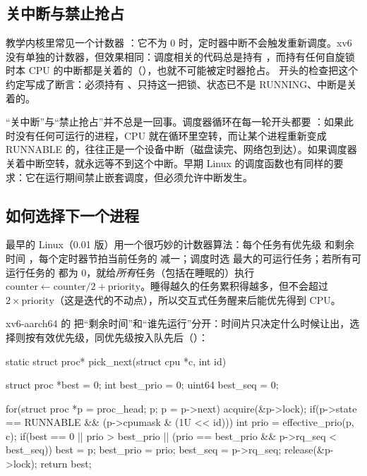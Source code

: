 \subsection{关中断与禁止抢占}

教学内核里常见一个计数器 ：它不为 0 时，定时器中断不会触发重新调度。xv6 没有单独的计数器，但效果相同：调度相关的代码总是持有 ，而持有任何自旋锁时本 CPU 的中断都是关着的（），也就不可能被定时器抢占。 开头的检查把这个约定写成了断言：必须持有 、只持这一把锁、状态已不是 RUNNING、中断是关着的。

“关中断”与“禁止抢占”并不总是一回事。调度器循环在每一轮开头都要 ：如果此时没有任何可运行的进程，CPU 就在循环里空转，而让某个进程重新变成 RUNNABLE 的，往往正是一个设备中断（磁盘读完、网络包到达）。如果调度器关着中断空转，就永远等不到这个中断。早期 Linux 的调度函数也有同样的要求：它在运行期间禁止嵌套调度，但必须允许中断发生。

\subsection{如何选择下一个进程}

最早的 Linux（0.01 版）用一个很巧妙的计数器算法：每个任务有优先级  和剩余时间 ，每个定时器节拍当前任务的  减一；调度时选  最大的可运行任务；若所有可运行任务的  都为 0，就给\emph{所有}任务（包括在睡眠的）执行 $\text{counter} \leftarrow \text{counter}/2 + \text{priority}$。睡得越久的任务累积得越多，但不会超过 $2\times\text{priority}$（这是迭代的不动点），所以交互式任务醒来后能优先得到 CPU。

xv6-aarch64 的  把“剩余时间”和“谁先运行”分开：时间片只决定什么时候让出，选择则按有效优先级，同优先级按入队先后（）：

\begin{ccode}
static struct proc* pick_next(struct cpu *c, int id)
{
  struct proc *best = 0;
  int best_prio = 0;
  uint64 best_seq = 0;

  for(struct proc *p = proc_head; p; p = p->next){
    acquire(&p->lock);
    if(p->state == RUNNABLE && (p->cpumask & (1U << id))){
      int prio = effective_prio(p, c);
      if(best == 0 || prio > best_prio ||
         (prio == best_prio && p->rq_seq < best_seq)){
        best = p;
        best_prio = prio;
        best_seq = p->rq_seq;
      }
    }
    release(&p->lock);
  }
  return best;
}
\end{ccode}

